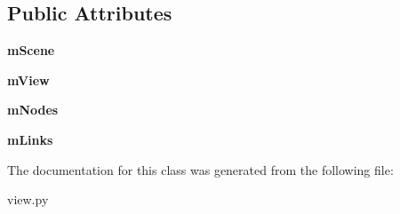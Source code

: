 \subsection*{Public Attributes}
\begin{DoxyCompactItemize}
\item 
\hypertarget{classview_1_1Example_a593d2f15ead06099bd90e4c1523f9af2}{{\bfseries m\-Scene}}\label{classview_1_1Example_a593d2f15ead06099bd90e4c1523f9af2}

\item 
\hypertarget{classview_1_1Example_a77cbbbc9c24ea48834b0cbc4ee70cd44}{{\bfseries m\-View}}\label{classview_1_1Example_a77cbbbc9c24ea48834b0cbc4ee70cd44}

\item 
\hypertarget{classview_1_1Example_adc6ad20992e91847c2eca453a2e48e80}{{\bfseries m\-Nodes}}\label{classview_1_1Example_adc6ad20992e91847c2eca453a2e48e80}

\item 
\hypertarget{classview_1_1Example_a1aedee1f1cd91ca85b5baca3c4925d87}{{\bfseries m\-Links}}\label{classview_1_1Example_a1aedee1f1cd91ca85b5baca3c4925d87}

\end{DoxyCompactItemize}


The documentation for this class was generated from the following file\-:\begin{DoxyCompactItemize}
\item 
view.\-py\end{DoxyCompactItemize}
